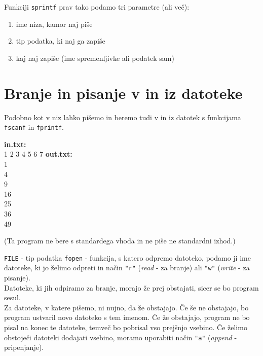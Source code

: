 \documentclass{book}
\begin{document}
\noindent Funkciji \verb+sprintf+ prav tako podamo tri parametre (ali več):
\begin{enumerate}
	\item ime niza, kamor naj piše
	\item tip podatka, ki naj ga zapiše
	\item kaj naj zapiše (ime spremenljivke ali podatek sam)
\end{enumerate}

\newpage
\section{Branje in pisanje v in iz datoteke}

Podobno kot v niz lahko pišemo in beremo tudi v in iz datotek s funkcijama
\verb+fscanf+ in \verb+fprintf+.

\begin{examples}


\begin{inout}
{\color{blue} \bf in.txt:} \\
1 2 3 4 5 6 7
\tcblower
{\color{blue} \bf out.txt:} \\
1\\
4\\
9\\
16\\
25\\
36\\
49
\end{inout}

(Ta program ne bere s standardega vhoda in ne piše ne standardni izhod.)
\end{examples}

\verb+FILE+ - tip podatka
\verb+fopen+ - funkcija, s katero odpremo datoteko, podamo ji ime datoteke, ki
jo želimo odpreti in način \verb+"r"+ (\emph{read} - za branje) ali \verb+"w"+
(\emph{write} - za pisanje).\\ Datoteke, ki jih odpiramo za branje, morajo že
prej obstajati, sicer se bo program sesul. \\

Za datoteke, v katere pišemo, ni nujno, da že obstajajo. Če še ne obstajajo, bo
program ustvaril novo datoteko s tem imenom. Če že obstajajo, program ne bo
pisal na konec te datoteke, temveč bo pobrisal vso prejšnjo vsebino.
Če želimo obstoječi datoteki dodajati vsebino, moramo uporabiti način
\verb+"a"+ (\emph{append} - pripenjanje).
\end{document}
